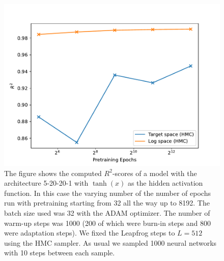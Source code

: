 \begin{figure}[h!]
    \centering
    \includegraphics[scale=0.7]{figures/r2_scores/r2_score_vs_pretraining.pdf}
    \caption{The figure shows the computed $R^2$-scores of a model with the architecture 5-20-20-1 with $\tanh(x)$ as the
    hidden activation function. In this case the varying number of the number of epochs run with pretraining starting from 32 all the way up to 8192. The batch size used was 32 with the ADAM optimizer. The number of warm-up steps was 1000 (200 of which were burn-in steps and 800 were adaptation steps). We fixed the Leapfrog steps to $L = 512$ using the HMC sampler. As usual we sampled 1000 neural networks with 10 steps between each sample.
    }
    \label{fig:r2_score_vs_pretraining}
\end{figure}


